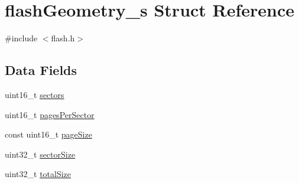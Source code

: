 \hypertarget{structflashGeometry__s}{\section{flash\+Geometry\+\_\+s Struct Reference}
\label{structflashGeometry__s}
}


{\ttfamily \#include $<$flash.\+h$>$}

\subsection*{Data Fields}
\begin{DoxyCompactItemize}
\item 
uint16\+\_\+t \hyperlink{structflashGeometry__s_a6f5856fc447cad3f678cd6138671daee}{sectors}
\item 
uint16\+\_\+t \hyperlink{structflashGeometry__s_a1ceb96ef0ccf43eaf75501156b651b20}{pages\+Per\+Sector}
\item 
const uint16\+\_\+t \hyperlink{structflashGeometry__s_a41534c29001f0490f5f8206ca567966a}{page\+Size}
\item 
uint32\+\_\+t \hyperlink{structflashGeometry__s_a4e3e22b4119139a1bc12683bd63fb5a2}{sector\+Size}
\item 
uint32\+\_\+t \hyperlink{structflashGeometry__s_afd69c15d0f91048c7532dcb005578fca}{total\+Size}
\end{DoxyCompactItemize}



